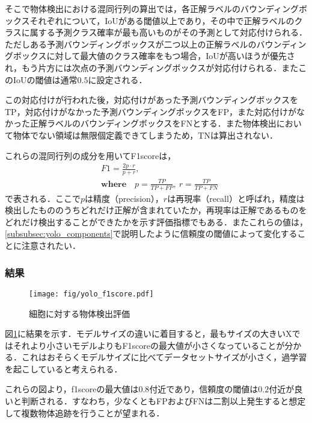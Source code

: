     そこで物体検出における混同行列の算出では，各正解ラベルのバウンディングボックスそれぞれについて，IoUがある閾値以上であり，その中で正解ラベルのクラスに属する予測クラス確率が最も高いものがその予測として対応付けられる．ただしある予測バウンディングボックスが二つ以上の正解ラベルのバウンディングボックスに対して最大値のクラス確率をもつ場合，IoUが高いほうが優先され，もう片方には次点の予測バウンディングボックスが対応付けられる．またこのIoUの閾値は通常$0.5$に設定される．

    この対応付けが行われた後，対応付けがあった予測バウンディングボックスをTP，対応付けがなかった予測バウンディングボックスをFP，また対応付けがなかった正解ラベルのバウンディングボックスをFNとする．また物体検出において物体でない領域は無限個定義できてしまうため，TNは算出されない．

    これらの混同行列の成分を用いてF1scoreは，
    \begin{equation}
        \label{eq:f1_score}
        \begin{aligned}
            &F1 = \frac{2 p\cdot r}{p + r},
            \\ &\textbf{where} \quad p = \frac{TP}{TP + FP}, ~ r = \frac{TP}{TP + FN}
        \end{aligned}
    \end{equation}
    で表される．ここで$p$は精度（precision），$r$は再現率（recall）と呼ばれ，精度は検出したもののうちどれだけ正解が含まれていたか，再現率は正解であるものをどれだけ検出することができたかを示す評価指標でもある．またこれらの値は，\ref{subsubsec:yolo_components}で説明したように信頼度の閾値によって変化することに注意されたい．

    \subsubsection{結果}

    \begin{figure}[t]
        \centering
        \texttt{[image: fig/yolo\_f1score.pdf]}
        \caption[細胞に対する物体検出評価]{細胞に対する物体検出評価}
        \label{fig:yolo_f1score}
    \end{figure}

    図\ref{fig:yolo_f1score}に結果を示す．モデルサイズの違いに着目すると，最もサイズの大きいXではそれより小さいモデルよりもF1scoreの最大値が小さくなっていることが分かる．これはおそらくモデルサイズに比べてデータセットサイズが小さく，過学習を起こしていると考えられる．

    これらの図より，f1scoreの最大値は$0.8$付近であり，信頼度の閾値は$0.2$付近が良いと判断される．すなわち，少なくともFPおよびFNは二割以上発生すると想定して複数物体追跡を行うことが望まれる．


